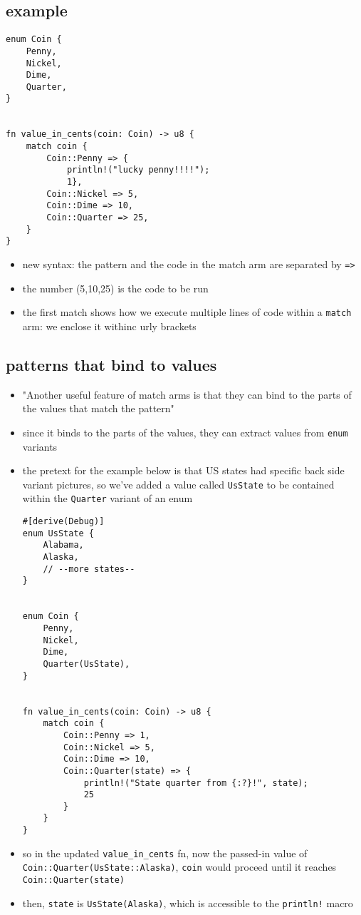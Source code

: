 \documentclass[11pt]{article}
\begin{document}
\subsection{example}
\label{sec:org7e42f44}
\begin{verbatim}
enum Coin {
    Penny,
    Nickel,
    Dime,
    Quarter,
}


fn value_in_cents(coin: Coin) -> u8 {
    match coin {
        Coin::Penny => {
            println!("lucky penny!!!!");
            1},
        Coin::Nickel => 5,
        Coin::Dime => 10,
        Coin::Quarter => 25,
    }
}
\end{verbatim}
\begin{itemize}
\item new syntax: the pattern and the code in the match arm are separated by \texttt{=>}
\item the number (5,10,25) is the code to be run
\item the first match shows how we execute multiple lines of code within a \texttt{match} arm: we enclose it withinc urly brackets
\end{itemize}
\subsection{patterns that bind to values}
\label{sec:org54a7572}
\begin{itemize}
\item "Another useful feature of match arms is that they can bind to the parts of the  values that match the pattern"
\item since it binds to the parts of the values, they can extract values from \texttt{enum} variants
\end{itemize}
\begin{itemize}
\item the pretext for the example below is that US states had specific back side variant pictures, so we've added a value called \texttt{UsState} to be contained within the \texttt{Quarter} variant of an enum
\begin{verbatim}
#[derive(Debug)]
enum UsState {
    Alabama,
    Alaska,
    // --more states--
}


enum Coin {
    Penny,
    Nickel,
    Dime,
    Quarter(UsState),
}


fn value_in_cents(coin: Coin) -> u8 {
    match coin {
        Coin::Penny => 1,
        Coin::Nickel => 5,
        Coin::Dime => 10,
        Coin::Quarter(state) => {
            println!("State quarter from {:?}!", state);
            25
        }
    }
}

\end{verbatim}
\item so in the updated \texttt{value\_in\_cents} fn, now the passed-in value of \texttt{Coin::Quarter(UsState::Alaska)}, \texttt{coin} would proceed until it reaches \texttt{Coin::Quarter(state)}
\item then, \texttt{state} is \texttt{UsState(Alaska)}, which is accessible to the \texttt{println!} macro
\end{itemize}
\end{document}
